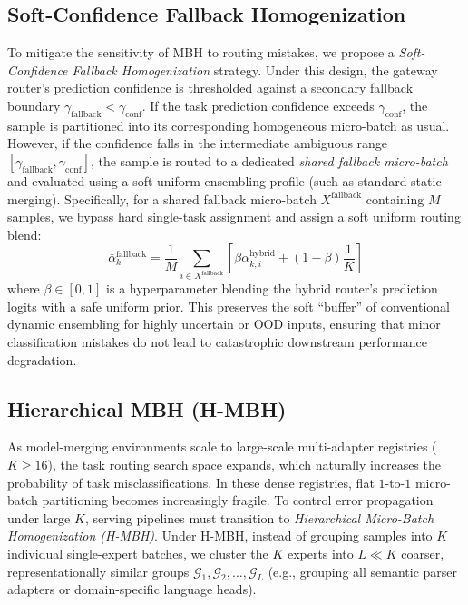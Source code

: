 \documentclass{article}
\theoremstyle{plain}
\theoremstyle{definition}
\theoremstyle{remark}
\begin{document}
\subsection{Soft-Confidence Fallback Homogenization}
To mitigate the sensitivity of MBH to routing mistakes, we propose a \emph{Soft-Confidence Fallback Homogenization} strategy. Under this design, the gateway router's prediction confidence is thresholded against a secondary fallback boundary $\gamma_{\text{fallback}} < \gamma_{\text{conf}}$. If the task prediction confidence exceeds $\gamma_{\text{conf}}$, the sample is partitioned into its corresponding homogeneous micro-batch as usual. However, if the confidence falls in the intermediate ambiguous range $[\gamma_{\text{fallback}}, \gamma_{\text{conf}}]$, the sample is routed to a dedicated \emph{shared fallback micro-batch} and evaluated using a soft uniform ensembling profile (such as standard static merging). Specifically, for a shared fallback micro-batch $X^{\text{fallback}}$ containing $M$ samples, we bypass hard single-task assignment and assign a soft uniform routing blend:
\begin{equation}
\bar{\alpha}_k^{\text{fallback}} = \frac{1}{M} \sum_{i \in X^{\text{fallback}}} \left[ \beta \alpha^{\text{hybrid}}_{k, i} + (1-\beta) \frac{1}{K} \right]
\end{equation}
where $\beta \in [0, 1]$ is a hyperparameter blending the hybrid router's prediction logits with a safe uniform prior. This preserves the soft ``buffer'' of conventional dynamic ensembling for highly uncertain or OOD inputs, ensuring that minor classification mistakes do not lead to catastrophic downstream performance degradation.

\subsection{Hierarchical MBH (H-MBH)}
As model-merging environments scale to large-scale multi-adapter registries ($K \ge 16$), the task routing search space expands, which naturally increases the probability of task misclassifications. In these dense registries, flat $1$-to-$1$ micro-batch partitioning becomes increasingly fragile. To control error propagation under large $K$, serving pipelines must transition to \emph{Hierarchical Micro-Batch Homogenization (H-MBH)}. Under H-MBH, instead of grouping samples into $K$ individual single-expert batches, we cluster the $K$ experts into $L \ll K$ coarser, representationally similar groups $\mathcal{G}_1, \mathcal{G}_2, \dots, \mathcal{G}_L$ (e.g., grouping all semantic parser adapters or domain-specific language heads). 
\end{document}

